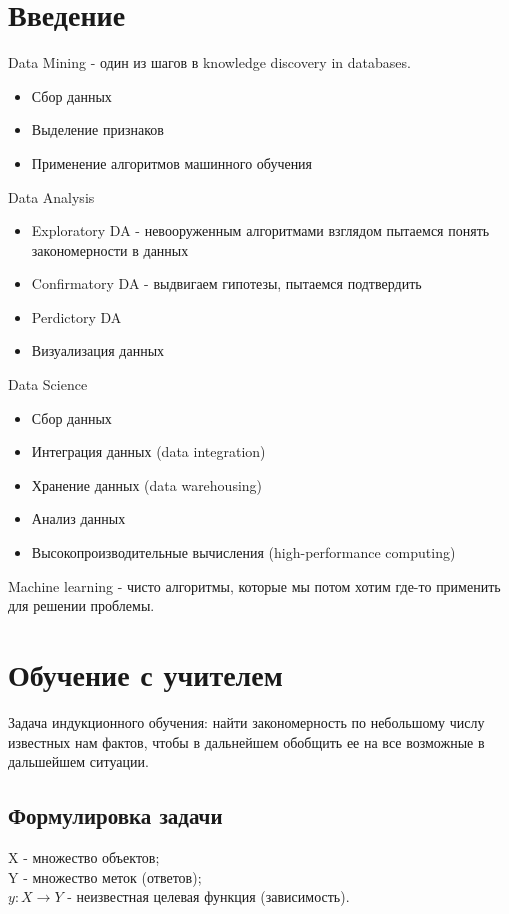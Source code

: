 \documentclass{amsart}
\begin{document}

\section{Введение}

Data Mining - один из шагов в knowledge discovery in databases.
\begin{itemize}
    \item Сбор данных 
    \item Выделение признаков
    \item Применение алгоритмов машинного обучения
\end{itemize}

Data Analysis
\begin{itemize}
    \item Exploratory DA - невооруженным алгоритмами взглядом пытаемся понять закономерности в данных
    \item Confirmatory DA - выдвигаем гипотезы, пытаемся подтвердить
    \item Perdictory DA
    \item Визуализация данных
\end{itemize}

Data Science 
\begin{itemize}
    \item Сбор данных
    \item Интеграция данных (data integration)
    \item Хранение данных (data warehousing)
    \item Анализ данных
    \item Высокопроизводительные вычисления (high-performance computing)
\end{itemize}

Machine learning - чисто алгоритмы, которые мы потом хотим где-то применить для решении проблемы.

\section{Обучение с учителем}

Задача индукционного обучения: найти закономерность по небольшому числу известных нам фактов, чтобы в дальнейшем обобщить ее на все возможные в дальшейшем ситуации.

\subsection{Формулировка задачи}
\hfill \newline
X - множество объектов; \\
Y - множество меток (ответов); \\
$y: X \rightarrow Y$ - неизвестная целевая функция (зависимость).
\end{document}
